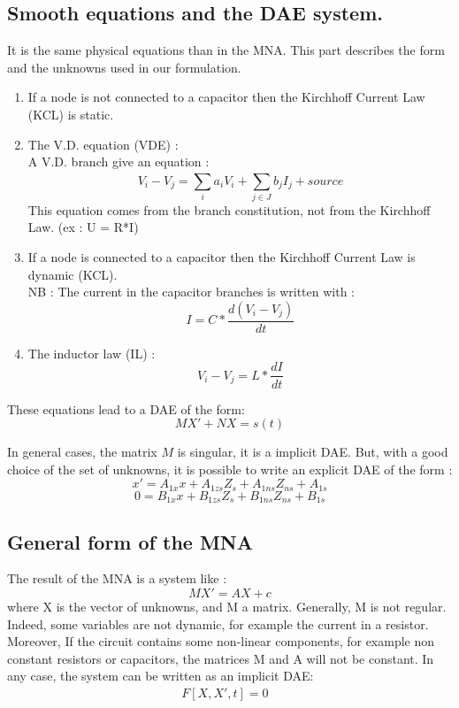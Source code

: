 \subsection{Smooth equations and the DAE system.}
It is the same physical equations than in the MNA. This part describes the form and the unknowns
used in our formulation.

\begin{enumerate} 
 \item If a node is not connected to a capacitor then the Kirchhoff Current Law (KCL) is static. \\
  \item The V.D. equation (VDE) : \\
    A V.D. branch give an equation :
    \[V_{i}-V_{j} = \sum_{i}^{}a_{i}V_{i} + \sum_{j\in J}^{}b_{j}I_{j} +   source\]
    This equation comes from the branch constitution, not from the Kirchhoff Law. (ex : U = R*I)
  \item If a node is connected to a capacitor then the Kirchhoff Current Law is dynamic (KCL).\\
    NB : The current in the capacitor branches is written with :
    \[I = C*\frac{d(V_{i} - V_{j})}{dt}\]
  \item The inductor law (IL) : 
     \[V_{i} - V_{j} = L*\frac{dI}{dt}\]
\end{enumerate}

These equations lead to a DAE of the form:
\[MX'+NX=s(t)\]

In general cases, the matrix $M$ is singular, it is a implicit DAE. But, with a good choice of the set of unknowns, it is
possible to write an explicit DAE of the form :
\[x' = A_{1x}x +A_{1zs}Z_{s} + A_{1ns}Z_{ns}+A_{1s}\]
\[0  = B_{1x}x+B_{1zs}Z_{s} + B_{1ns}Z_{ns}+B_{1s}\]



\subsection{General form of the MNA}
The result of the MNA is a system like :
\[MX'=AX+c\]
where X is the vector of unknowns, and M a matrix. Generally, M is not regular. Indeed, some variables
are not dynamic, for example the current in a resistor.
Moreover, If the circuit contains some non-linear components, for example non constant resistors or capacitors,
the matrices M and A will not be constant. In any case, the system can be written as an implicit DAE:
\begin{eqnarray}
F[X,X',t]=0&\label{eq-mna-dae}
\end{eqnarray}

